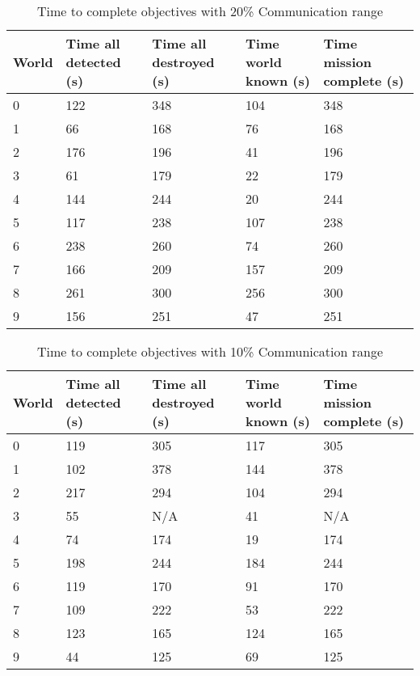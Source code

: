 \begin{table}[H]
	\caption{Time to complete objectives with 20\% Communication range}
	\centering
	\label{tab:comm20}
	
	\begin{tabular}{|p{1cm}|p{1.75cm}|p{1.75cm}|p{1.5cm}|p{2cm}|}
		\hline
		World & Time all detected (s) & Time all destroyed (s) & Time world known (s) & Time mission complete (s) \\
		\hline
		0&122&348&104&348 \\ \hline
		1&66&168&76&168 \\ \hline
		2&176&196&41&196 \\ \hline
		3&61&179&22&179 \\ \hline
		4&144&244&20&244 \\ \hline
		5&117&238&107&238 \\ \hline
		6&238&260&74&260 \\ \hline
		7&166&209&157&209 \\ \hline
		8&261&300&256&300 \\ \hline
		9&156&251&47&251 \\ \hline
	\end{tabular}
\end{table}

\begin{table}[H]
	\caption{Time to complete objectives with 10\% Communication range}
	\centering
	\label{tab:comm10}
	
	\begin{tabular}{|p{1cm}|p{1.75cm}|p{1.75cm}|p{1.5cm}|p{2cm}|}
		\hline
		World & Time all detected (s) & Time all destroyed (s) & Time world known (s) & Time mission complete (s) \\
		\hline
		0&119&305&117&305 \\ \hline
		1&102&378&144&378 \\ \hline
		2&217&294&104&294 \\ \hline
		3&55&N/A&41&N/A\\ \hline
		4&74&174&19&174 \\ \hline
		5&198&244&184&244 \\ \hline
		6&119&170&91&170 \\ \hline
		7&109&222&53&222 \\ \hline
		8&123&165&124&165 \\ \hline
		9&44&125&69&125 \\ \hline

	\end{tabular}
\end{table}


